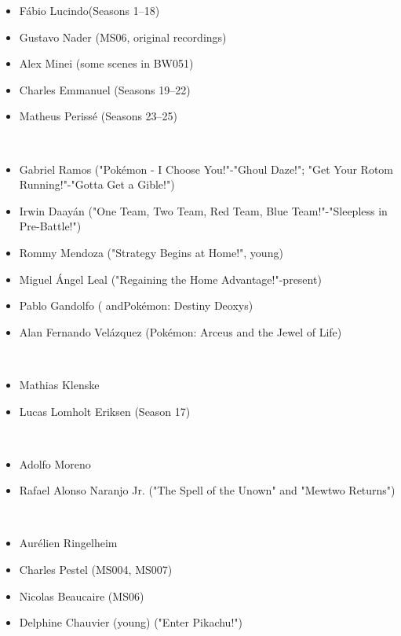 \documentclass[a4paper,12pt]{article}
\begin{document}
\begin{itemize}
\item Fábio Lucindo(Seasons 1–18)
\item Gustavo Nader (MS06, original recordings)
\item Alex Minei (some scenes in BW051)
\item Charles Emmanuel (Seasons 19–22)
\item Matheus Perissé (Seasons 23–25)
\end{itemize}\\ \par \vspace{0.5cm}

\begin{itemize}
\item Gabriel Ramos ("Pokémon - I Choose You!"-"Ghoul Daze!"; "Get Your Rotom Running!"-"Gotta Get a Gible!")
\item Irwin Daayán ("One Team, Two Team, Red Team, Blue Team!"-"Sleepless in Pre-Battle!")
\item Rommy Mendoza ("Strategy Begins at Home!", young)
\item Miguel Ángel Leal ("Regaining the Home Advantage!"-present)
\item Pablo Gandolfo ( andPokémon: Destiny Deoxys)
\item Alan Fernando Velázquez (Pokémon: Arceus and the Jewel of Life)
\end{itemize}\\ \par \vspace{0.5cm}

\begin{itemize}
\item Mathias Klenske
\item Lucas Lomholt Eriksen (Season 17)
\end{itemize}\\ \par \vspace{0.5cm}

\begin{itemize}
\item Adolfo Moreno
\item Rafael Alonso Naranjo Jr. ("The Spell of the Unown" and "Mewtwo Returns")
\end{itemize}\\ \par \vspace{0.5cm}

\begin{itemize}
\item Aurélien Ringelheim
\item Charles Pestel (MS004, MS007)
\item Nicolas Beaucaire (MS06)
\item Delphine Chauvier (young) ("Enter Pikachu!")
\end{itemize}\\ \par \vspace{0.5cm}
\end{document}

